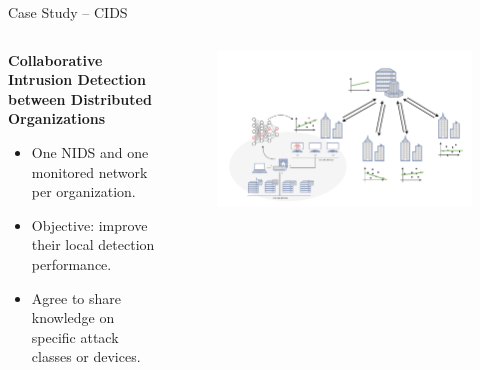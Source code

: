 \begin{frame}{Case Study -- CIDS}

  \begin{columns}
    \begin{column}{0.4\textwidth}
      \textbf{Collaborative Intrusion Detection between Distributed Organizations}
  \begin{itemize}[<+->]
    \item One NIDS and one monitored network per organization.
    \item \alert{Objective:} improve their local detection performance.
    \item Agree to share knowledge on specific attack classes or devices.
  \end{itemize}
    \end{column}
    
    \begin{column}{0.6\textwidth}
      \begin{figure}
        \centering
        \includegraphics[width=1.1\linewidth,center]{figures/intro/cids.drawio.pdf}
      \end{figure}
    \end{column}
  \end{columns}
\end{frame}



